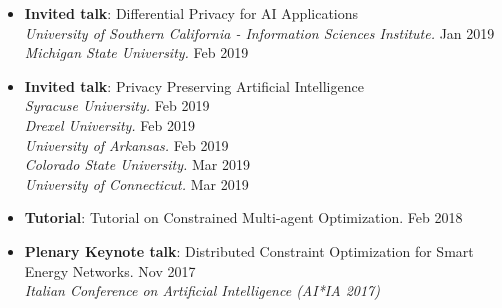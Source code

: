 \begin{itemize}
  \item {\bf Invited talk}: Differential Privacy for AI Applications\\
  {\em University of Southern California - Information Sciences Institute.} \hfill {Jan 2019}\\
  {\em Michigan State University.} \hfill {Feb 2019}

  \item {\bf Invited talk}: Privacy Preserving Artificial Intelligence\\
  {\em Syracuse University.} \hfill {Feb 2019}\\
  {\em Drexel University.} \hfill {Feb 2019}\\
  {\em University of Arkansas.} \hfill {Feb 2019}\\
  {\em Colorado State University.} \hfill {Mar 2019}\\
  {\em University of Connecticut.} \hfill {Mar 2019}






	\item {\bf Tutorial}: {Tutorial on Constrained Multi-agent Optimization.} \hfill {Feb 2018}\\
  	

	\item {\bf Plenary Keynote talk}: Distributed Constraint Optimization for Smart Energy Networks. \hfill {Nov 2017}\\
    {\em Italian Conference on Artificial Intelligence (AI*IA 2017)}
	


\end{itemize}
